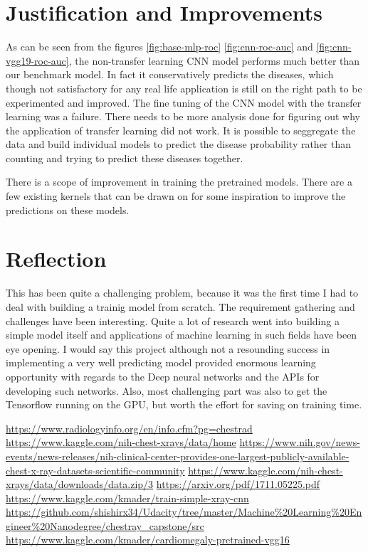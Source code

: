 \documentclass{article}
\begin{document}
    \section{Justification and Improvements}
    As can be seen from the figures \ref{fig:base-mlp-roc} \ref{fig:cnn-roc-auc} and \ref{fig:cnn-vgg19-roc-auc}, the non-transfer learning CNN model performs much better than our benchmark model. In fact it conservatively predicts the diseases, which though not satisfactory for any real life application is still on the right path to be experimented and improved. The fine tuning of the CNN model with the transfer learning was a failure. There needs to be more analysis done for figuring out why the application of transfer learning did not work. It is possible to seggregate the data and build individual models to predict the disease probability rather than counting and trying to predict these diseases together. 

    There is a scope of improvement in training the pretrained models. There are a few existing kernels that can be drawn on for some inspiration to improve the predictions on these models.\cite{cardio-kaggle}

    \section{Reflection}
    This has been quite a challenging problem, because it was the first time I had to deal with building a trainig model from scratch. The requirement gathering and challenges have been interesting. Quite a lot of research went into building a simple model itself and applications of machine learning in such fields have been eye opening. I would say this project although not a resounding success in implementing a very well predicting model provided enormous learning opportunity with regards to the Deep neural networks and the APIs for developing such networks. Also, most challenging part was also to get the Tensorflow running on the GPU, but worth the effort for saving on training time. 

    \begin{thebibliography}{999}

         \url{https://www.radiologyinfo.org/en/info.cfm?pg=chestrad}
         \url{https://www.kaggle.com/nih-chest-xrays/data/home} 
         \url{https://www.nih.gov/news-events/news-releases/nih-clinical-center-provides-one-largest-publicly-available-chest-x-ray-datasets-scientific-community}
         \url{https://www.kaggle.com/nih-chest-xrays/data/downloads/data.zip/3}
         \url{https://arxiv.org/pdf/1711.05225.pdf}
         \url{https://www.kaggle.com/kmader/train-simple-xray-cnn}
         \url{https://github.com/shishirx34/Udacity/tree/master/Machine%20Learning%20Engineer%20Nanodegree/chestray_capstone/src}
         \url{https://www.kaggle.com/kmader/cardiomegaly-pretrained-vgg16}

    \end{thebibliography}
\end{document}
